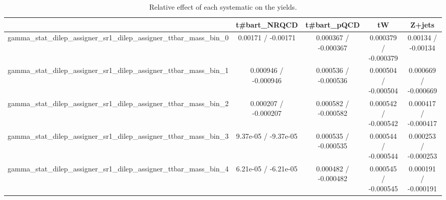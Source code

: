 \documentclass[10pt]{article}
\begin{document}
\begin{table}[htbp]
\begin{center}
\begin{tabular}{|c|c|c|c|c|}
\hline 
      & t#bar{t}_{NRQCD}      & t#bar{t}_{pQCD}      & tW      & Z+jets \\ 
\hline 
  gamma_stat_dilep_assigner_sr1_dilep_assigner_ttbar_mass_bin_0 & 0.00171 / -0.00171 & 0.000367 / -0.000367 & 0.000379 / -0.000379 & 0.00134 / -0.00134 \\ 
  gamma_stat_dilep_assigner_sr1_dilep_assigner_ttbar_mass_bin_1 & 0.000946 / -0.000946 & 0.000536 / -0.000536 & 0.000504 / -0.000504 & 0.000669 / -0.000669 \\ 
  gamma_stat_dilep_assigner_sr1_dilep_assigner_ttbar_mass_bin_2 & 0.000207 / -0.000207 & 0.000582 / -0.000582 & 0.000542 / -0.000542 & 0.000417 / -0.000417 \\ 
  gamma_stat_dilep_assigner_sr1_dilep_assigner_ttbar_mass_bin_3 & 9.37e-05 / -9.37e-05 & 0.000535 / -0.000535 & 0.000544 / -0.000544 & 0.000253 / -0.000253 \\ 
  gamma_stat_dilep_assigner_sr1_dilep_assigner_ttbar_mass_bin_4 & 6.21e-05 / -6.21e-05 & 0.000482 / -0.000482 & 0.000545 / -0.000545 & 0.000191 / -0.000191 \\ 
\hline 
\end{tabular} 
\caption{Relative effect of each systematic on the yields.} 
\end{center} 
\end{table} 
\end{document}
